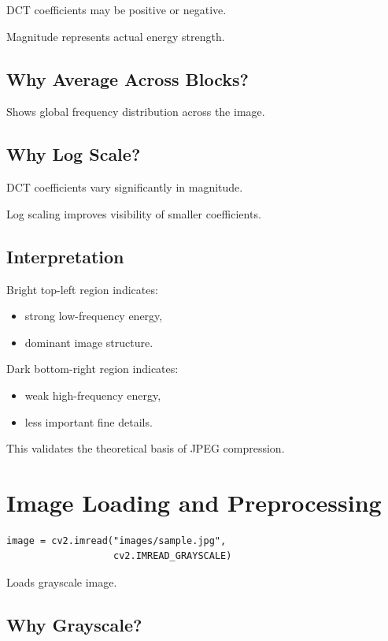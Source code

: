 \documentclass[12pt,a4paper]{article}
\begin{document}
DCT coefficients may be positive or negative.

Magnitude represents actual energy strength.

\subsection{Why Average Across Blocks?}

Shows global frequency distribution across the image.

\subsection{Why Log Scale?}

DCT coefficients vary significantly in magnitude.

Log scaling improves visibility of smaller coefficients.

\subsection{Interpretation}

Bright top-left region indicates:
\begin{itemize}
    \item strong low-frequency energy,
    \item dominant image structure.
\end{itemize}

Dark bottom-right region indicates:
\begin{itemize}
    \item weak high-frequency energy,
    \item less important fine details.
\end{itemize}

This validates the theoretical basis of JPEG compression.

\section{Image Loading and Preprocessing}

\begin{lstlisting}
image = cv2.imread("images/sample.jpg",
                   cv2.IMREAD_GRAYSCALE)
\end{lstlisting}

Loads grayscale image.

\subsection{Why Grayscale?}
\end{document}
